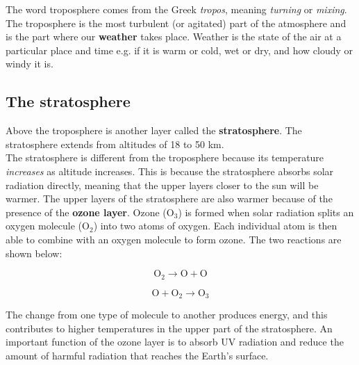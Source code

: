 The word troposphere comes from the Greek \textit{tropos}, meaning \textit{turning} or \textit{mixing}. The troposphere is the most turbulent (or agitated) part of the atmosphere and is the part where our \textbf{weather} takes place. Weather is the state of the air at a particular place and time e.g. if it is warm or cold, wet or dry, and how cloudy or windy it is. 
 \\

\subsection{The stratosphere}

Above the troposphere is another layer called the \textbf{stratosphere}. The stratosphere extends from altitudes of 18 to 50 km.  \\

The stratosphere is different from the troposphere because its temperature \textit{increases} as altitude increases. This is because the stratosphere absorbs solar radiation directly, meaning that the upper layers closer to the sun will be warmer. The upper layers of the stratosphere are also warmer because of the presence of the \textbf{ozone layer}. Ozone (O$_{3}$) is formed when solar radiation splits an oxygen molecule (O$_{2}$) into two atoms of oxygen. Each individual atom is then able to combine with an oxygen molecule to form ozone. The two reactions are shown below:


\begin{equation*}
\text{O}_{2} \rightarrow \text{O} + \text{O}
\end{equation*}

\begin{equation*}
\text{O} + \text{O}_{2} \rightarrow \text{O}_{3}
\end{equation*}



The change from one type of molecule to another produces energy, and this contributes to higher temperatures in the upper part of the stratosphere. An important function of the ozone layer is to absorb UV radiation and reduce the amount of harmful radiation that reaches the Earth's surface.

